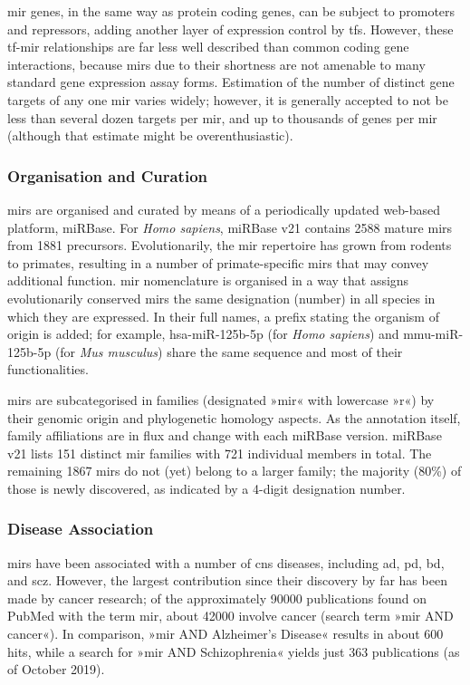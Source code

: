\ac{mir} genes, in the same way as protein coding genes, can be subject to promoters and repressors, adding another layer of expression control by \acp{tf}. However, these \ac{tf}-\ac{mir} relationships are far less well described than common coding gene interactions, because \acp{mir} due to their shortness are not amenable to many standard gene expression assay forms. Estimation of the number of distinct gene targets of any one \ac{mir} varies widely; however, it is generally accepted to not be less than several dozen targets per \ac{mir}, and up to thousands of genes per \ac{mir} (although that estimate might be overenthusiastic).

\subsubsection{Organisation and Curation}
\acp{mir} are organised and curated by means of a periodically updated web-based platform, miRBase\cite{Kozomara2019}. For \textit{Homo sapiens}, miRBase v21 contains 2588 mature \acp{mir} from 1881 precursors. Evolutionarily, the \ac{mir} repertoire has grown from rodents to primates, resulting in a number of primate-specific \acp{mir} that may convey additional function. \ac{mir} nomenclature is organised\cite{Ambros2003} in a way that assigns evolutionarily conserved \acp{mir} the same designation (number) in all species in which they are expressed. In their full names, a prefix stating the organism of origin is added; for example, hsa-miR-125b-5p (for \textit{Homo sapiens}) and mmu-miR-125b-5p (for \textit{Mus musculus}) share the same sequence and most of their functionalities.

\acp{mir} are subcategorised in families (designated »mir« with lowercase »r«) by their genomic origin and phylogenetic homology aspects. As the annotation itself, family affiliations are in flux and change with each miRBase version. miRBase v21 lists 151 distinct \ac{mir} families with 721 individual members in total. The remaining 1867 \acp{mir} do not (yet) belong to a larger family; the majority (80\%) of those is newly discovered, as indicated by a 4-digit designation number.

\subsubsection{Disease Association}
\acp{mir} have been associated with a number of \ac{cns} diseases, including \ac{ad}, \ac{pd}, \ac{bd}, and \ac{scz}. However, the largest contribution since their discovery by far has been made by cancer research; of the approximately \num{90000} publications found on PubMed with the term \ac{mir}, about \num{42000} involve cancer (search term »\ac{mir} AND cancer«). In comparison, »\ac{mir} AND Alzheimer's Disease« results in about 600 hits, while a search for »\ac{mir} AND Schizophrenia« yields just 363 publications (as of October 2019).

